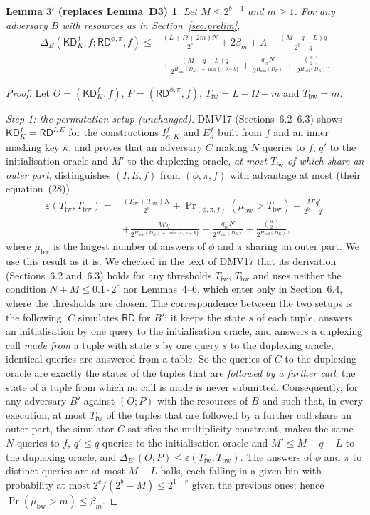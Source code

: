 \documentclass[11pt,a4paper]{article}
\newtheorem*{lemthreep}{Lemma $3'$ {\normalfont (replaces Lemma~D3)}}
\theoremstyle{definition}
\theoremstyle{remark}
\newcommand{\KD}{\mathsf{KD}}
\newcommand{\RD}{\mathsf{RD}}
\newcommand{\mubw}{\mu_{\mathrm{bw}}}
\newcommand{\Tfw}{T_{\mathrm{fw}}}
\newcommand{\Tbw}{T_{\mathrm{bw}}}
\newcommand{\Hmin}{H_{\min}}
\newcommand{\Hcoll}{H_{\mathrm{coll}}}
\begin{document}
\begin{lemthreep}
Let $M \le 2^{b-1}$ and $m \ge 1$. For any adversary $B$ with resources as in Section~\ref{sec:prelim},
\begin{align*}
\Delta_B(\KD^f_K, f ; \RD^{\phi,\pi}, f) \le{}& \frac{(L+\Omega+2m)N}{2^c} + 2\beta_m + \Lambda + \frac{(M-q-L)q}{2^b-q} \\
 &+ \frac{(M-q-L)q}{2^{\Hmin(D_K)+\min\{c,\,b-k\}}} + \frac{q_{iv}N}{2^{\Hmin(D_K)}} + \frac{\binom{u}{2}}{2^{\Hcoll(D_K)}} .
\end{align*}
\end{lemthreep}
\begin{proof}
Let $O = (\KD^f_K, f)$, $P = (\RD^{\phi,\pi}, f)$, $\Tfw = L + \Omega + m$ and $\Tbw = m$.

\emph{Step 1: the permutation setup (unchanged).} DMV17 (Sections~6.2--6.3) shows $\KD^f_K = \RD^{I, E}$ for the
constructions $I^f_{\kappa,K}$ and $E^f_\kappa$ built from $f$ and an inner masking key $\kappa$, and proves that an adversary $C$
making $N$ queries to $f$, $q'$ to the initialisation oracle and $M'$ to the duplexing oracle, \emph{at most $\Tfw$ of
which share an outer part}, distinguishes $(I, E, f)$ from $(\phi, \pi, f)$ with advantage at most (their equation~(28))
\begin{align*}
 \varepsilon(\Tfw, \Tbw) ={}& \frac{(\Tfw + \Tbw)N}{2^c} + \Pr\nolimits_{(\phi,\pi,f)}(\mubw > \Tbw) + \frac{M'q'}{2^b - q'} \\
 &+ \frac{M'q'}{2^{\Hmin(D_K)+\min\{c,\,b-k\}}} + \frac{q_{iv}N}{2^{\Hmin(D_K)}} + \frac{\binom{u}{2}}{2^{\Hcoll(D_K)}},
\end{align*}
where $\mubw$ is the largest number of answers of $\phi$ and $\pi$ sharing an outer part. We use this result as it is.
We checked in the text of DMV17 that its derivation (Sections~6.2 and~6.3) holds for any thresholds $\Tfw$, $\Tbw$ and
uses neither the condition $N + M \le 0.1 \cdot 2^c$ nor Lemmas~4--6, which enter only in Section~6.4, where the thresholds
are chosen.
The correspondence between the two setups is the following. $C$ simulates $\RD$ for $B'$: it keeps the state $s$ of
each tuple, answers an initialisation by one query to the initialisation oracle, and answers a duplexing call
\emph{made from} a tuple with state $s$ by one query $s$ to the duplexing oracle; identical queries are answered from a
table. So the queries of $C$ to the duplexing oracle are exactly the states of the tuples that are \emph{followed by a
further call}; the state of a tuple from which no call is made is never submitted. Consequently, for any adversary
$B'$ against $(O ; P)$ with the resources of $B$ and such that, in every execution, at most $\Tfw$ of the tuples that are
followed by a further call share an outer part, the simulator $C$ satisfies the multiplicity constraint, makes the same
$N$ queries to $f$, $q' \le q$ queries to the initialisation oracle and $M' \le M - q - L$ to the duplexing oracle, and
$\Delta_{B'}(O ; P) \le \varepsilon(\Tfw, \Tbw)$. The answers of $\phi$ and $\pi$ to distinct queries are at most $M - L$ balls, each
falling in a given bin with probability at most $2^c/(2^b - M) \le 2^{1-r}$ given the previous ones; hence
$\Pr(\mubw > m) \le \beta_m$.


\end{proof}
\end{document}
